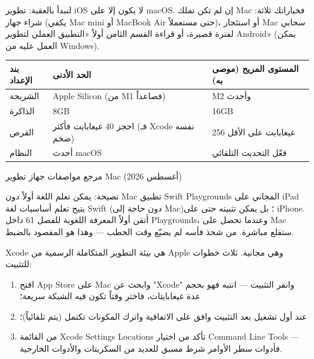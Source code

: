 


لنبدأ بالعقبة: تطوير iOS لا يكون إلا على macOS. إن لم تكن تملك Mac فخياراتك ثلاثة: شراء جهاز (يكفي Mac mini أو MacBook Air حتى مستعملاً)، أو استئجار Mac سحابي لفترة قصيرة، أو قراءة القسم الثامن أولاً «التطبيق العملي لتطوير Android» (يمكن العمل عليه من Windows).

\begin{center}
\begin{tabularx}{\linewidth}{|X|X|X|}
\hline
\textbf{بند الإعداد} & \textbf{الحد الأدنى} & \textbf{المستوى المريح (موصى به)} \tabularnewline
\hline
الشريحة & Apple Silicon (من M1 فصاعداً) & M2 وأحدث \tabularnewline
الذاكرة & 8GB & 16GB \tabularnewline
القرص & احجز 40 غيغابايت فأكثر (فـ Xcode نفسه ضخم) & 256 غيغابايت على الأقل \tabularnewline
النظام & أحدث macOS & فعّل التحديث التلقائي \tabularnewline
\hline
\end{tabularx}
\end{center}

\begin{center}\small\color{gray}مرجع مواصفات جهاز تطوير Mac (أغسطس 2026)\end{center}

\begin{tcbinfo}{نصيحة: يمكن تعلم اللغة أولاً دون Mac}
تطبيق Swift Playgrounds المجاني على iPad يتيح تعلم أساسيات لغة Swift (دون حاجة إلى Mac)؛ بل يمكن تثبيته حتى على iPhone. أتقن أولاً المعرفة اللغوية للفصل 61 داخل Playgrounds، وعندما تحصل على Mac ستقلع مباشرة. من شحذ فأسه لم يضيّع وقت الحطب — وهذا هو المقصود بالضبط.

\end{tcbinfo}


Xcode هي بيئة التطوير المتكاملة الرسمية من Apple وهي مجانية. ثلاث خطوات للتثبيت:

\begin{enumerate}
  \item افتح App Store على Mac وابحث عن "Xcode" وانقر التثبيت — انتبه فهو بحجم عدة غيغابايتات، فاختر وقتاً تكون فيه الشبكة سريعة؛
  \item عند أول تشغيل بعد التثبيت وافق على الاتفاقية واترك المكونات تكتمل (يتم تلقائياً)؛
  \item من القائمة Xcode Settings Locations تأكد من اختيار Command Line Tools — فأدوات سطر الأوامر شرط مسبق للعديد من السكربتات والأدوات الخارجية.
\end{enumerate}

